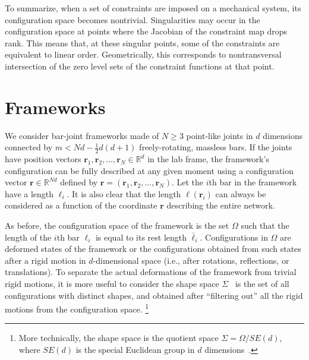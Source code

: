 

To summarize, when a set of constraints are imposed on a mechanical system, its configuration space becomes nontrivial.
Singularities may occur in the configuration space at points where the Jacobian of the constraint map drops rank.
This means that, at these singular points, some of the constraints are equivalent to linear order.
Geometrically, this corresponds to nontransversal intersection of the zero level sets of the constraint functions at that point.

\section{Frameworks}

We consider bar-joint frameworks made of $N \geq 3$ point-like joints in $d$ dimensions connected by $m < Nd - \frac{1}{2}d(d+1)$ freely-rotating, massless bars.
If the joints have position vectors $\bm{r}_1, \bm{r}_2, \ldots, \bm{r}_{N} \in \mathbb{R}^d$ in the lab frame, the framework's configuration can be fully described at any given moment using a configuration vector $\bm{r}\in\mathbb{R}^{N d}$ defined by $\bm{r} = (\bm{r}_1, \bm{r}_2, \ldots, \bm{r}_{N})$.
Let the $i$th bar in the framework have a length $\ell_{i}$.
It is also clear that the length $\ell(\bm{r}_{i})$ can always be considered as a function of the coordinate $\bm{r}$ describing the entire network.

As before, the configuration space of the framework is the set $\Omega$ such that the length of the $i$th bar $\ell_{i}$ is equal to its rest length $\bar{\ell}_{i}$.
Configurations in $\Omega$ are deformed states of the framework or the configurations obtained from such states after a rigid motion in $d$-dimensional space (i.e., after rotations, reflections, or translations).
To separate the actual deformations of the framework from trivial rigid motions, it is more useful to consider the shape space $\Sigma$~\cite{kendall1989,mezey1993,kendall1999} is the set of all configurations with distinct shapes, and
obtained after ``filtering out'' all the rigid motions from the configuration space.%
\footnote{More technically, the shape space is the quotient space $\Sigma = \Omega/SE(d)$, where $SE(d)$ is the special Euclidean group in $d$ dimensions~\cite{littlejohn1995}.}

